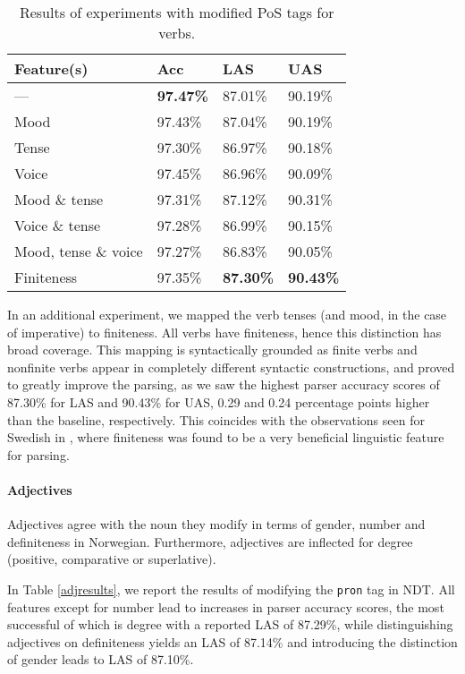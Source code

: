 \documentclass[11pt,a4paper]{article}
\begin{document}
\begin{table}
    \centering
    \smaller[0.5]
    \begin{tabular}{@{}llll@{}}
        \toprule
        \textbf{Feature(s)} & \textbf{Acc} & \textbf{LAS} & \textbf{UAS} \\
        \midrule
        --- & \textbf{97.47\%} & 87.01\% & 90.19\% \\
        Mood & 97.43\% & 87.04\% & 90.19\% \\
        Tense & 97.30\% & 86.97\% & 90.18\% \\
        Voice & 97.45\% & 86.96\% & 90.09\% \\
        Mood \& tense & 97.31\% & 87.12\% & 90.31\% \\
        Voice \& tense & 97.28\% & 86.99\% & 90.15\% \\
        Mood, tense \& voice & 97.27\% & 86.83\% & 90.05\% \\
        Finiteness & 97.35\% & \textbf{87.30\%} & \textbf{90.43\%} \\
        \bottomrule
    \end{tabular}
    \caption{Results of experiments with modified PoS tags for verbs.}
    \label{verbresults}
\end{table}

In an additional experiment, we mapped the verb tenses (and mood, in the case
of imperative) to finiteness. All verbs have finiteness, hence this distinction
has broad coverage. This mapping is syntactically grounded as finite verbs and
nonfinite verbs appear in completely different syntactic constructions, and
proved to greatly improve the parsing, as we saw the highest parser accuracy
scores of 87.30\% for LAS and 90.43\% for UAS, 0.29 and 0.24 percentage points
higher than the baseline, respectively. This coincides with the observations
seen for Swedish in , where finiteness was found
to be a very beneficial linguistic feature for parsing.

\paragraph{Adjectives}
Adjectives agree with the noun they modify in terms of gender, number and
definiteness in Norwegian. Furthermore, adjectives are inflected for
degree (positive, comparative or superlative).

In Table \ref{adjresults}, we report the results of modifying the \texttt{pron}
tag in NDT. All features except for number lead to increases in parser accuracy
scores, the most successful of which is degree with a reported LAS of 87.29\%,
while distinguishing adjectives on definiteness yields an LAS of 87.14\% and
introducing the distinction of gender leads to LAS of 87.10\%.
\end{document}
